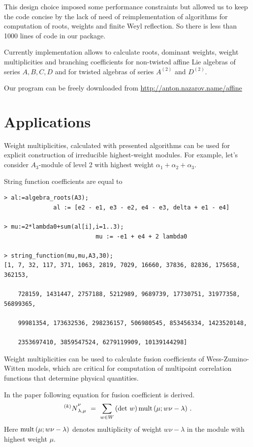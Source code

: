 \documentclass[a4paper,12pt]{article}
\theoremstyle{definition} \newtheorem{Def}{Definition}
\def\la{{\lambda}}\def\al{{\alpha}}\def\be{{\beta}}\def\ga{{\gamma}}
\def\Nk{{{ }^{(k)}N}}\def\Vk{{{ }^{(k)}V}}
\begin{document}
This design choice imposed some performance constraints but allowed us
to keep the code concise by the lack of need of reimplementation of
algorithms for computation of roots, weights and finite Weyl
reflection. So there is less than 1000 lines of code in our package.

Currently implementation allows to calculate roots, dominant weights,
weight multiplicities and branching coefficients for non-twisted
affine Lie algebras of series $A,B,C,D$ and for twisted algebras of
series $A^{(2)}$ and $D^{(2)}$.

Our program can be freely downloaded from \url{http://anton.nazarov.name/affine}

\section{Applications}
\label{sec:applications}

Weight multiplicities, calculated with presented algorithms can be
used for explicit construction of irreducible highest-weight modules.
For example, let's consider $A_3$-module of level 2 with highest
weight $\alpha_1+\alpha_2+\alpha_3$. 

String function coefficients are equal to
\begin{verbatim}
> al:=algebra_roots(A3);
              al := [e2 - e1, e3 - e2, e4 - e3, delta + e1 - e4]

> mu:=2*lambda0+sum(al[i],i=1..3);
                          mu := -e1 + e4 + 2 lambda0

> string_function(mu,mu,A3,30);
[1, 7, 32, 117, 371, 1063, 2819, 7029, 16660, 37836, 82836, 175658, 362153,

    728159, 1431447, 2757188, 5212989, 9689739, 17730751, 31977358, 56899365,

    99981354, 173632536, 298236157, 506980545, 853456334, 1423520148,

    2353697410, 3859547524, 6279119909, 10139144298]
\end{verbatim}

Weight multiplicities can be used to calculate fusion coefficients of
Wess-Zumino-Witten models, which are critical for computation of
multipoint correlation functions that determine physical quantities. 

In the paper \cite{Walton:1999xc} following equation for fusion
coefficient is derived.
\begin{equation}
  \label{eq:5}
\Nk_{\la,\mu}^\nu\ =\ \sum_{w\in W}\, (\det\,w)\, 
\mult(\mu; w\nu-\la)\ .
 \end{equation}
Here $\mult(\mu; w\nu-\la)$ denotes multiplicity of weight
$w\nu-\lambda$ in the module with highest weight $\mu$.
\end{document}
